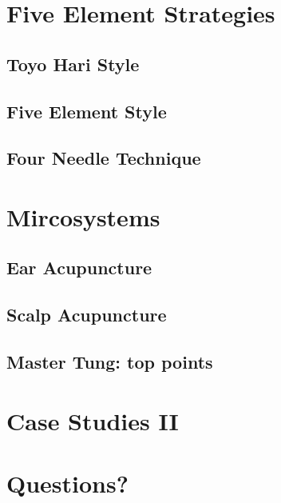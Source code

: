 \section{Five Element Strategies}

\subsection{Toyo Hari Style}

\subsection{Five Element Style}

\subsection{Four Needle Technique}

\section{Mircosystems}

\subsection{Ear Acupuncture}

\subsection{Scalp Acupuncture}

\subsection{Master Tung: top points}

\section{Case Studies II}

\section{Questions?} 

\begin{frame}
\end{frame}


